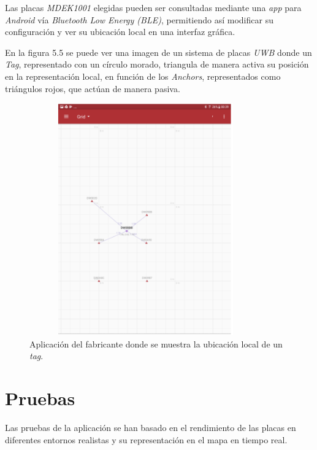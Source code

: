 Las placas \textit{MDEK1001} elegidas pueden ser consultadas mediante una \textit{app} para \textit{Android} vía \textit{Bluetooth Low Energy (BLE)}, permitiendo así modificar su configuración  y ver su ubicación local en una interfaz gráfica.

En la figura 5.5 se puede ver una imagen de un sistema de placas \textit{UWB} donde un \textit{Tag}, representado con un círculo morado, triangula de manera activa su posición en la representación local, en función de los \textit{Anchors}, representados como triángulos rojos, que actúan de manera pasiva.

\begin{figure}[t]
    \centering
    \includegraphics[width=10cm,height=10cm,keepaspectratio]{img/LocationTags.png}
    \caption{Aplicación del fabricante donde se muestra la ubicación local de un \textit{tag}.}
    \label{fig:app-local-representation}
\end{figure}



\section{Pruebas}
Las pruebas de la aplicación se han basado en el rendimiento de las placas en diferentes entornos realistas y su representación en el mapa en tiempo real. 

